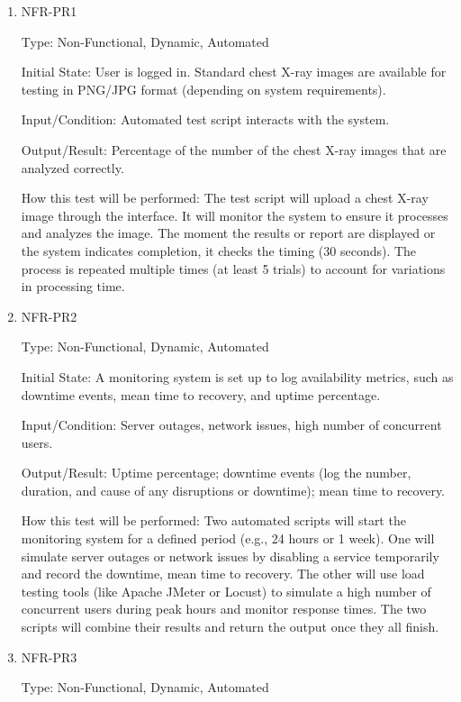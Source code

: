 \documentclass[12pt, titlepage]{article}
\begin{document}
\begin{enumerate}
\begin{enumerate}
\begin{enumerate}
\begin{enumerate}
\item{NFR-PR1\\}\label{NFR-PR1}

Type: Non-Functional, Dynamic, Automated

Initial State: User is logged in. Standard chest X-ray images are available for testing in PNG/JPG format (depending on system requirements).

Input/Condition: Automated test script interacts with the system.

Output/Result: Percentage of the number of the chest X-ray images that are analyzed correctly.

How this test will be performed: The test script will upload a chest X-ray image through the interface. It will monitor the system to ensure it processes and analyzes the image. The moment the results or report are displayed or the system indicates completion, it checks the timing (30 seconds). The process is repeated multiple times (at least 5 trials) to account for variations in processing time.

\item{NFR-PR2\\}\label{NFR-PR2}

Type: Non-Functional, Dynamic, Automated

Initial State: A monitoring system is set up to log availability metrics, such as downtime events, mean time to recovery, and uptime percentage.

Input/Condition: Server outages, network issues, high number of concurrent users.

Output/Result: Uptime percentage; downtime events (log the number, duration, and cause of any disruptions or downtime); mean time to recovery.

How this test will be performed: Two automated scripts will start the monitoring system for a defined period (e.g., 24 hours or 1 week). One will simulate server outages or network issues by disabling a service temporarily and record the downtime, mean time to recovery. The other will use load testing tools (like Apache JMeter or Locust) to simulate a high number of concurrent users during peak hours and monitor response times. The two scripts will combine their results and return the output once they all finish.

\item{NFR-PR3\\}\label{NFR-PR3}

Type: Non-Functional, Dynamic, Automated


\end{enumerate}
\end{enumerate}
\end{enumerate}
\end{enumerate}
\end{document}
